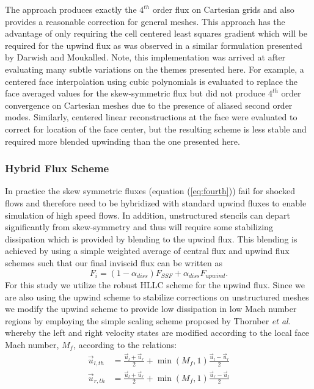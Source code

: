 The approach produces exactly the $4^{th}$ order flux on Cartesian
grids and also provides a reasonable correction for general meshes.
This approach has the advantage of only requiring the cell centered
least squares gradient which will be required for the upwind flux as
was observed in a similar formulation presented by Darwish and
Moukalled\cite{Darwish.2003}.  Note, this implementation was arrived at
after evaluating many subtle variations on the themes presented here.
For example, a centered face interpolation using cubic polynomials is
evaluated to replace the face averaged values for the skew-symmetric
flux but did not produce $4^{th}$ order convergence on Cartesian
meshes due to the presence of aliased second order modes.  Similarly,
centered linear reconstructions at the face were evaluated to correct
for location of the face center, but the resulting scheme is less
stable and required more blended upwinding than the one presented
here.

\subsubsection{Hybrid Flux Scheme}

In practice the skew symmetric fluxes (equation (\ref{eq:fourth}))
fail for shocked flows and therefore need to be hybridized with standard
upwind fluxes to enable simulation of high speed flows.  In addition,
unstructured stencils can depart significantly from skew-symmetry and
thus will require some stabilizing dissipation which is provided by
blending to the upwind flux. This blending is achieved by using a
simple weighted average of central flux and upwind flux schemes such
that our final inviscid flux can be written as
\begin{equation}
F_i = (1-\alpha_{diss})F_{SSF} + \alpha_{diss} F_{upwind}.
\end{equation}
For this study we utilize the robust HLLC scheme\cite{Torro.1994} for
the upwind flux.  Since we are also using the upwind scheme to
stabilize corrections on unstructured meshes we modify the 
upwind scheme to provide low dissipation in low Mach number regions by
employing the simple scaling scheme proposed by Thornber {\it et
  al.}\cite{Thornber.2008} whereby the left and right velocity states
are modified according to the local face Mach number, $M_{f}$,
according to the relations:
\begin{equation}
\begin{aligned}
\vec{u}_{l,th} &= \frac{\vec{u}_l + \vec{u}_r}{2} + \min(M_{f},1) \frac{\vec{u}_l-\vec{u}_r}{2}\\
\vec{u}_{r,th} &= \frac{\vec{u}_l + \vec{u}_r}{2} + \min(M_{f},1) \frac{\vec{u}_r-\vec{u}_l}{2}\\
\end{aligned}
\end{equation}

